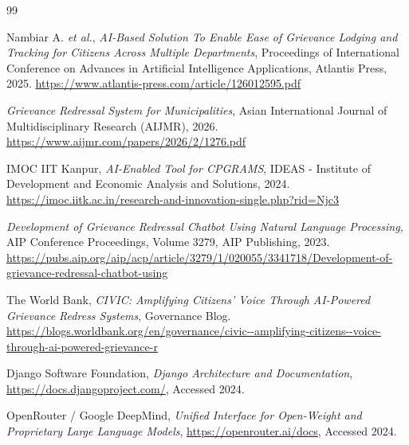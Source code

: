 \documentclass[12pt,a4paper]{report}
\begin{document}
\begin{thebibliography}{99}

Nambiar A. \textit{et al.}, \emph{AI-Based Solution To Enable Ease of Grievance Lodging and Tracking for Citizens Across Multiple Departments}, Proceedings of International Conference on Advances in Artificial Intelligence Applications, Atlantis Press, 2025. \url{https://www.atlantis-press.com/article/126012595.pdf}

\emph{Grievance Redressal System for Municipalities}, Asian International Journal of Multidisciplinary Research (AIJMR), 2026. \url{https://www.aijmr.com/papers/2026/2/1276.pdf}

IMOC IIT Kanpur, \emph{AI-Enabled Tool for CPGRAMS}, IDEAS - Institute of Development and Economic Analysis and Solutions, 2024. \url{https://imoc.iitk.ac.in/research-and-innovation-single.php?rid=Njc3}

\emph{Development of Grievance Redressal Chatbot Using Natural Language Processing}, AIP Conference Proceedings, Volume 3279, AIP Publishing, 2023. \url{https://pubs.aip.org/aip/acp/article/3279/1/020055/3341718/Development-of-grievance-redressal-chatbot-using}

The World Bank, \emph{CIVIC: Amplifying Citizens' Voice Through AI-Powered Grievance Redress Systems}, Governance Blog. \url{https://blogs.worldbank.org/en/governance/civic--amplifying-citizens--voice-through-ai-powered-grievance-r}

Django Software Foundation, \emph{Django Architecture and Documentation}, \url{https://docs.djangoproject.com/}, Accessed 2024.

OpenRouter / Google DeepMind, \emph{Unified Interface for Open-Weight and Proprietary Large Language Models}, \url{https://openrouter.ai/docs}, Accessed 2024.

\end{thebibliography}
\end{document}
